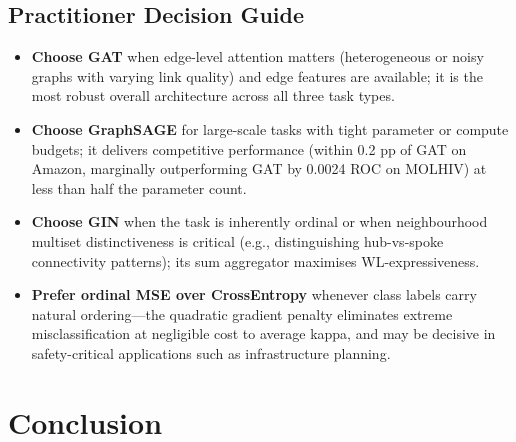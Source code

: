 \documentclass[conference]{IEEEtran}
\begin{document}
\subsection{Practitioner Decision Guide}

\begin{itemize}
    \item \textbf{Choose GAT} when edge-level attention matters (heterogeneous or noisy graphs with varying link quality) and edge features are available; it is the most robust overall architecture across all three task types.
    \item \textbf{Choose GraphSAGE} for large-scale tasks with tight parameter or compute budgets; it delivers competitive performance (within 0.2 pp of GAT on Amazon, marginally outperforming GAT by 0.0024 ROC on MOLHIV) at less than half the parameter count.
    \item \textbf{Choose GIN} when the task is inherently ordinal or when neighbourhood multiset distinctiveness is critical (e.g., distinguishing hub-vs-spoke connectivity patterns); its sum aggregator maximises WL-expressiveness.
    \item \textbf{Prefer ordinal MSE over CrossEntropy} whenever class labels carry natural ordering---the quadratic gradient penalty eliminates extreme misclassification at negligible cost to average kappa, and may be decisive in safety-critical applications such as infrastructure planning.
\end{itemize}

\section{Conclusion}
\end{document}
